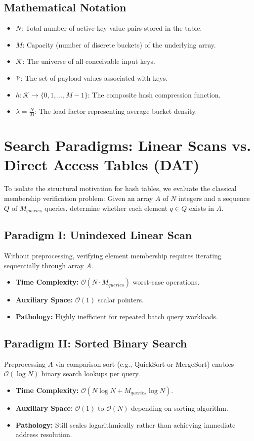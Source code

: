 \documentclass[10pt,twocolumn,letterpaper]{article}
\begin{document}
\subsection{Mathematical Notation}
\begin{itemize}
    \item $N$: Total number of active key-value pairs stored in the table.
    \item $M$: Capacity (number of discrete buckets) of the underlying array.
    \item $\mathcal{K}$: The universe of all conceivable input keys.
    \item $\mathcal{V}$: The set of payload values associated with keys.
    \item $h: \mathcal{K} \to \{0, 1, \dots, M-1\}$: The composite hash compression function.
    \item $\lambda = \frac{N}{M}$: The load factor representing average bucket density.
\end{itemize}

\section{Search Paradigms: Linear Scans vs. Direct Access Tables (DAT)}
\label{sec:search-paradigms}

To isolate the structural motivation for hash tables, we evaluate the classical membership verification problem: Given an array $A$ of $N$ integers and a sequence $Q$ of $M_{queries}$ queries, determine whether each element $q \in Q$ exists in $A$.

\subsection{Paradigm I: Unindexed Linear Scan}
Without preprocessing, verifying element membership requires iterating sequentially through array $A$.
\begin{itemize}
    \item \textbf{Time Complexity:} $\mathcal{O}(N \cdot M_{queries})$ worst-case operations.
    \item \textbf{Auxiliary Space:} $\mathcal{O}(1)$ scalar pointers.
    \item \textbf{Pathology:} Highly inefficient for repeated batch query workloads.
\end{itemize}

\subsection{Paradigm II: Sorted Binary Search}
Preprocessing $A$ via comparison sort (e.g., QuickSort or MergeSort) enables $\mathcal{O}(\log N)$ binary search lookups per query.
\begin{itemize}
    \item \textbf{Time Complexity:} $\mathcal{O}(N \log N + M_{queries} \log N)$.
    \item \textbf{Auxiliary Space:} $\mathcal{O}(1)$ to $\mathcal{O}(N)$ depending on sorting algorithm.
    \item \textbf{Pathology:} Still scales logarithmically rather than achieving immediate address resolution.
\end{itemize}
\end{document}
